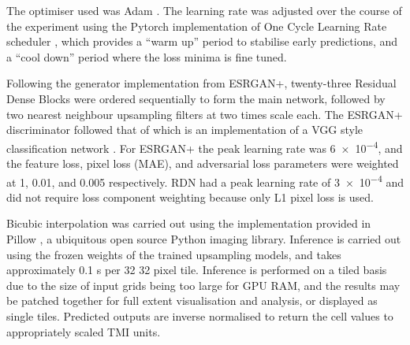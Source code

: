 The optimiser used was Adam \parencite{kingmaAdamMethodStochastic2015}.
The learning rate was adjusted over the course of the experiment using the Pytorch implementation of One Cycle Learning Rate scheduler \parencite{smithSuperconvergenceVeryFast2018}, which provides a “warm up” period to stabilise early predictions, and a “cool down” period where the loss minima is fine tuned.

Following the generator implementation from ESRGAN+, twenty-three Residual Dense Blocks were ordered sequentially to form the main network, followed by two nearest neighbour upsampling filters at two times scale each.
The ESRGAN+ discriminator followed that of \textcite{rakotonirinaESRGANFurtherImproving2020} which is an implementation of a VGG style classification network \parencite{simonyanVeryDeepConvolutional2015}.
For ESRGAN+ the peak learning rate was \num{6e-4}, and the feature loss, pixel loss (MAE), and adversarial loss parameters were weighted at \num{1}, \num{0.01}, and \num{0.005} respectively.
RDN\textdaggerdbl{} had a peak learning rate of \num{3e-4} and did not require loss component weighting because only L1 pixel loss is used.

Bicubic interpolation was carried out using the implementation provided in Pillow \parencite{vankemenadePythonpillowPillow2021}, a ubiquitous open source Python imaging library.
Inference is carried out using the frozen weights of the trained upsampling models, and takes approximately \num{0.1} s per 32 \texttimes{} 32 pixel tile.
Inference is performed on a tiled basis due to the size of input grids being too large for GPU RAM, and the results may be patched together for full extent visualisation and analysis, or displayed as single tiles.
Predicted outputs are inverse normalised to return the cell values to appropriately scaled TMI units.


